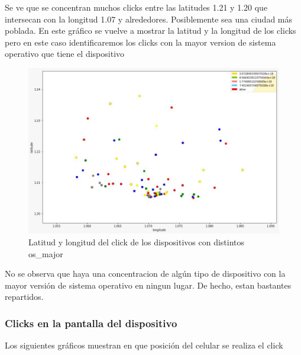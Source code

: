 \documentclass[a4paper, 12pt]{article}
\begin{document}
		 Se ve que se concentran muchos clicks entre las latitudes 1.21 y 1.20 que intersecan con la longitud 1.07 y alrededores. Posiblemente sea una ciudad más poblada.
		\newline
		\newline
		\newline
		\newline
		\newline
		 En este gráfico se vuelve a mostrar la latitud y la longitud de los clicks pero en este caso identificaremos los clicks con la mayor version de sistema operativo que tiene el dispositivo
		
		\FloatBarrier
		\begin{figure}[h]
			\centering
			\includegraphics[width=\textwidth]{images/clicks/clicks_lat_long_major_OS.png}
			\caption{Latitud y longitud del click de los dispositivos con distintos os\_major}
		\end{figure}
		\FloatBarrier

		 No se observa que haya una concentracion de algún tipo de dispositivo con la mayor versión de sistema operativo en ningun lugar. De hecho, estan bastantes repartidos.

	\subsubsection{Clicks en la pantalla del dispositivo}

		 Los siguientes gráficos muestran en que posición del celular se realiza el click
\end{document}
